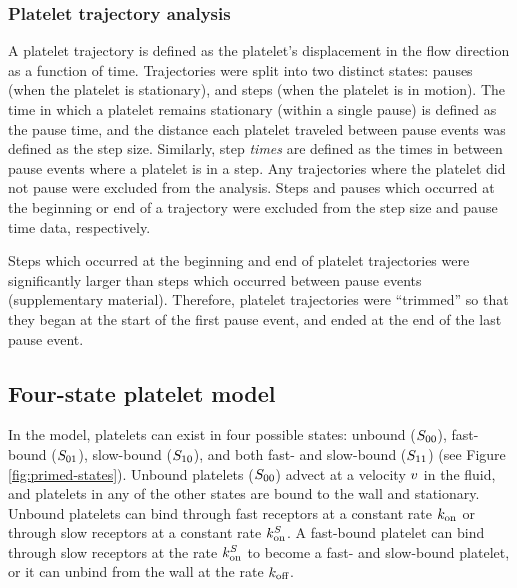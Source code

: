 \documentclass{biophys-new}
\begin{document}
\subsubsection*{Platelet trajectory analysis}

A platelet trajectory is defined as the platelet's displacement in the
flow direction as a function of time. Trajectories were split into two
distinct states: pauses (when the platelet is stationary), and steps
(when the platelet is in motion). The time in which a platelet remains
stationary (within a single pause) is defined as the pause time, and
the distance each platelet traveled between pause events was defined
as the step size. Similarly, step \emph{times} are defined as the
times in between pause events where a platelet is in a step. Any
trajectories where the platelet did not pause were excluded from the
analysis. Steps and pauses which occurred at the beginning or end of a
trajectory were excluded from the step size and pause time data,
respectively.

Steps which occurred at the beginning and end of platelet trajectories
were significantly larger than steps which occurred between pause
events (supplementary material). Therefore, platelet trajectories were
``trimmed'' so that they began at the start of the first pause event,
and ended at the end of the last pause event.


\subsection*{Four-state platelet model}

In the model, platelets can exist in four possible states: unbound
($S_{00}$), fast-bound ($S_{01}$), slow-bound
($S_{10}$), and both fast- and slow-bound ($S_{11}$) (see
Figure \ref{fig:primed-states}). Unbound platelets ($S_{00}$)
advect at a velocity $v$ in the fluid, and platelets in any of
the other states are bound to the wall and stationary. Unbound
platelets can bind through fast receptors at a constant rate
$k_\textnormal{on}$ or through slow receptors at a constant rate
$k^S_\textnormal{on}$. A fast-bound platelet can bind through slow receptors at
the rate $k^S_\textnormal{on}$ to become a fast- and slow-bound platelet, or it
can unbind from the wall at the rate $k_\textnormal{off}$.
\end{document}
